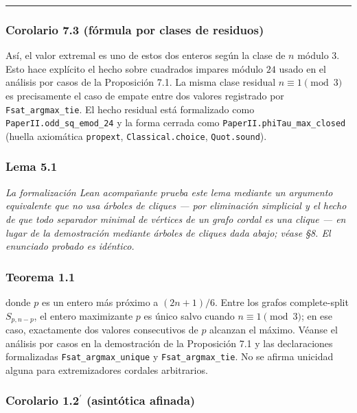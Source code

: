 \documentclass[spanish,11pt,a4paper]{article}
\begin{document}
\begin{center}\rule{0.5\linewidth}{0.5pt}\end{center}

\subsubsection{Corolario 7.3 (fórmula por clases de
residuos)}\label{corolario-7.3-fuxf3rmula-por-clases-de-residuos}

Así, el valor extremal es uno de estos dos enteros según la clase de
\(n\) módulo \(3\). Esto hace explícito el hecho sobre cuadrados impares
módulo \(24\) usado en el análisis por casos de la Proposición 7.1. La
misma clase residual \(n\equiv1\pmod3\) es precisamente el caso de
empate entre dos valores registrado por \nolinkurl{Fsat_argmax_tie}. El
hecho residual está formalizado como \nolinkurl{PaperII.odd_sq_emod_24}
y la forma cerrada como \nolinkurl{PaperII.phiTau_max_closed} (huella
axiomática \nolinkurl{propext}, \nolinkurl{Classical.choice},
\nolinkurl{Quot.sound}).

\subsubsection{Lema 5.1}\label{lema-5.1}

\emph{La formalización Lean acompañante prueba este lema mediante un
argumento equivalente que no usa árboles de cliques --- por eliminación
simplicial y el hecho de que todo separador minimal de vértices de un
grafo cordal es una clique --- en lugar de la demostración mediante
árboles de cliques dada abajo; véase §8. El enunciado probado es
idéntico.}

\subsubsection{Teorema 1.1}\label{teorema-1.1}

donde \(p\) es un entero más próximo a \((2n+1)/6\). Entre los grafos
complete-split \(S_{p,n-p}\), el entero maximizante \(p\) es único salvo
cuando \(n\equiv1\pmod3\); en ese caso, exactamente dos valores
consecutivos de \(p\) alcanzan el máximo. Véanse el análisis por casos
en la demostración de la Proposición 7.1 y las declaraciones
formalizadas \nolinkurl{Fsat_argmax_unique} y \nolinkurl{Fsat_argmax_tie}.
No se afirma unicidad alguna para extremizadores cordales arbitrarios.

\subsubsection{\texorpdfstring{Corolario 1.2\(^{\prime}\) (asintótica
afinada)}{Corolario 1.2\^{}\{\textbackslash prime\} (asintótica afinada)}}\label{corolario-1.2prime-asintuxf3tica-afinada-1}
\end{document}
